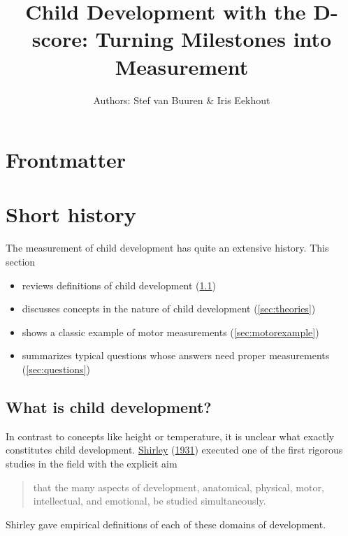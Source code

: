 \documentclass[
]{book}
\title{Child Development with the D-score: Turning Milestones into Measurement}
\author{Authors: Stef van Buuren \& Iris Eekhout}
\date{}
\providecommand{\tightlist}{%
  \setlength{\itemsep}{0pt}\setlength{\parskip}{0pt}}
\begin{document}
\maketitle

{
\setcounter{tocdepth}{1}
\tableofcontents
}
\hypertarget{frontmatter}{%
\chapter*{Frontmatter}\label{frontmatter}}

\newpage

\hypertarget{ch:history}{%
\chapter{Short history}\label{ch:history}}

The measurement of child development has quite an extensive history. This section

\begin{itemize}
\tightlist
\item
  reviews definitions of child development (\ref{sec:definitions})
\item
  discusses concepts in the nature of child development (\ref{sec:theories})
\item
  shows a classic example of motor measurements (\ref{sec:motorexample})
\item
  summarizes typical questions whose answers need proper measurements (\ref{sec:questions})
\end{itemize}

\hypertarget{sec:definitions}{%
\section{What is child development?}\label{sec:definitions}}

In contrast to concepts like height or temperature, it is unclear what exactly constitutes child development. \protect\hyperlink{ref-shirley1931}{Shirley} (\protect\hyperlink{ref-shirley1931}{1931}) executed one of the first rigorous studies in the field with the explicit aim

\begin{quote}
that the many aspects of development, anatomical, physical, motor, intellectual, and emotional, be studied simultaneously.
\end{quote}

Shirley gave empirical definitions of each of these domains of development.
\end{document}
